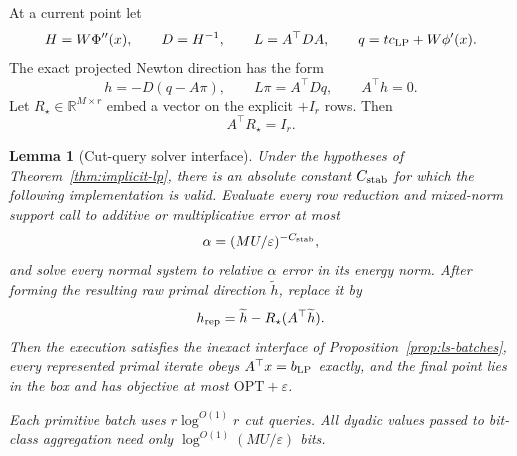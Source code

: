 \documentclass[11pt]{article}
\newtheorem{lemma}[theorem]{Lemma}
\theoremstyle{definition}
\newcommand{\eps}{\varepsilon}
\newcommand{\OPT}{\mathrm{OPT}}
\begin{document}
At a current point let
\[
 H=W\Phi''(x),\qquad D=H^{-1},\qquad
 L=A^\top DA,\qquad q=t c_{\rm LP}+W\phi'(x).
\]
The exact projected Newton direction has the form
\begin{equation}\label{eq:exact-newton}
 h=-D(q-A\pi),\qquad L\pi=A^\top Dq,\qquad A^\top h=0.
\end{equation}
Let $R_\star\in\mathbb R^{M\times r}$ embed a vector on the explicit
$+I_r$ rows.  Then
\begin{equation}\label{eq:star-right-inverse}
             A^\top R_\star=I_r.
\end{equation}

\begin{lemma}[Cut-query solver interface]\label{lem:solver-interface}
Under the hypotheses of Theorem~\ref{thm:implicit-lp}, there is an absolute
constant $C_{\rm stab}$ for which the following implementation is valid.
Evaluate every row reduction and mixed-norm support call to additive or
multiplicative error at most
\[
             \alpha=(MU/\eps)^{-C_{\rm stab}},
\]
and solve every normal system to relative $\alpha$ error in its energy norm.
After forming the resulting raw primal direction $\widetilde h$, replace it
by
\begin{equation}\label{eq:star-repair}
 h_{\rm rep}=\widetilde h-R_\star(A^\top\widetilde h).
\end{equation}
Then the execution satisfies the inexact interface of
Proposition~\ref{prop:ls-batches}, every represented primal iterate obeys
$A^\top x=b_{\rm LP}$ exactly, and the final point lies in the box and has
objective at most $\OPT+\eps$.

Each primitive batch uses $r\log^{O(1)}r$ cut queries.  All dyadic values
passed to bit-class aggregation need only
$\log^{O(1)}(MU/\eps)$ bits.
\end{lemma}
\end{document}
